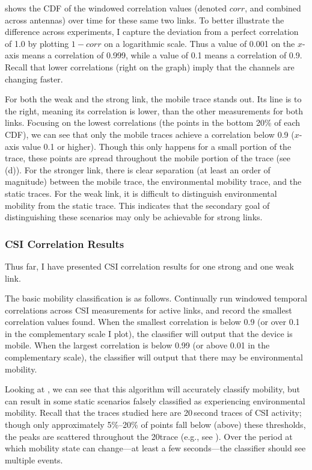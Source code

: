 shows the CDF of the windowed correlation values (denoted $\mathit{corr}$, and combined across antennas) over time for these same two links. To better illustrate the difference across experiments, I capture the deviation from a perfect correlation of 1.0 by plotting $1-\mathit{corr}$ on a logarithmic scale. Thus a value of 0.001 on the $x$-axis means a correlation of 0.999, while a value of 0.1 means a correlation of 0.9. Recall that lower correlations (right on the graph) imply that the channels are changing faster.

For both the weak and the strong link, the mobile trace stands out. Its line is to the right, meaning its correlation is lower, than the other measurements for both links. Focusing on the lowest correlations (the points in the bottom 20\% of each CDF), we can see that only the mobile traces achieve a correlation below 0.9 ($x$-axis value 0.1 or higher). Though this only happens for a small portion of the trace, these points are spread throughout the mobile portion of the trace (see (d)). For the stronger link, there is clear separation (at least an order of magnitude) between the mobile trace, the environmental mobility trace, and the static traces. For the weak link, it is difficult to distinguish environmental mobility from the static trace. This indicates that the secondary goal of distinguishing these scenarios may only be achievable for strong links.

\subsubsection{CSI Correlation Results}
Thus far, I have presented CSI correlation results for one strong and one weak link.

The basic mobility classification is as follows. Continually run windowed temporal correlations across CSI measurements for active links, and record the smallest correlation values found. When the smallest correlation is below 0.9 (or over 0.1 in the complementary scale I plot), the classifier will output that the device is mobile. When the largest correlation is below 0.99 (or above 0.01 in the complementary scale), the classifier will output that there may be environmental mobility.

Looking at , we can see that this algorithm will accurately classify mobility, but can result in some static scenarios falsely classified as experiencing environmental mobility. Recall that the traces studied here are 20\,second traces of CSI activity; though only approximately 5\%--20\% of points fall below (above) these thresholds, the peaks are scattered throughout the 20\s trace (e.g., see ). Over the period at which mobility state can change---at least a few seconds---the classifier should see multiple events.

